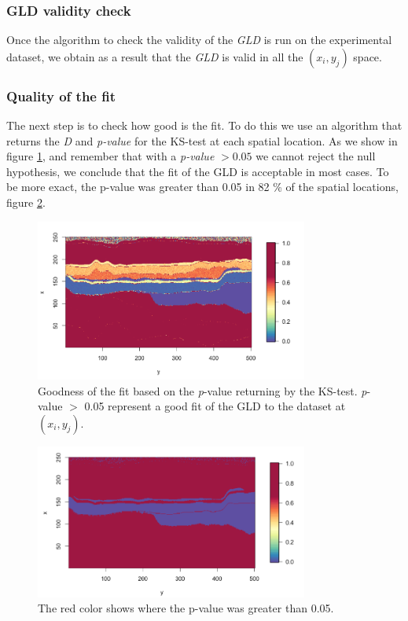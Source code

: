 \subsubsection{GLD validity check}\label{useCaseGLDValidityCheck}
Once the algorithm to check the validity of the \textit{GLD} is run on the experimental dataset, we obtain as a result that the \textit{GLD} is valid in all the $(x_{i},y_{j})$ space.

\subsubsection{Quality of the fit}\label{useCaseQualityofFit}
The next step is to check how good is the fit. To do this we use an algorithm that returns the \textit{D} and \textit{p-value} for the KS-test at each spatial location. As we show in figure \ref{fig:p_value}, and remember that with a \textit{p-value} $>0.05$ we cannot reject the null hypothesis, we conclude that the fit of the GLD is acceptable in most cases. To be more exact, the p-value was greater than 0.05 in 82 \% of the spatial locations, figure \ref{fig:p_values_greater_05}.

\begin{figure}[H]
    \centering
    \includegraphics[width=0.8\textwidth]{images/p_value.png}
    \caption{Goodness of the fit based on the \textit{p}-value returning by the KS-test. \textit{p}-value $>$ 0.05 represent a good fit of the GLD to the dataset at $(x_{i}, y_{j})$.}
    \label{fig:p_value}
\end{figure}

\begin{figure}[H]
    \centering
    \includegraphics[width=0.8\textwidth]{images/p_value_greater_05.png}
    \caption{The red color shows where the p-value was greater than 0.05.}
    \label{fig:p_values_greater_05}
\end{figure}


